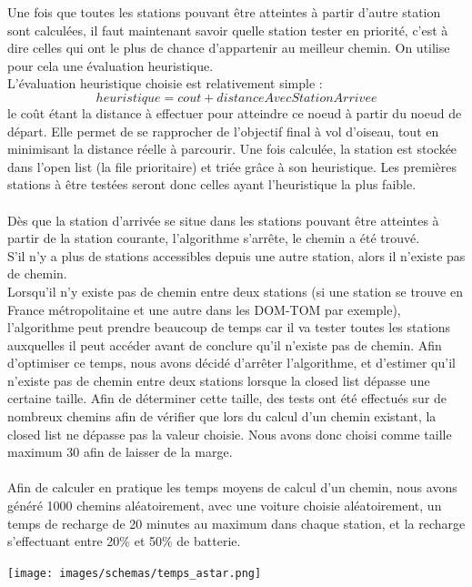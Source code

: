 \documentclass[12pt,titlepage]{report}
\begin{document}
Une fois que toutes les stations pouvant être atteintes à partir d'autre station sont calculées, il faut maintenant savoir quelle station tester en priorité, c'est à dire celles qui ont le plus de chance d'appartenir au meilleur chemin. On utilise pour cela une évaluation heuristique.\\
L'évaluation heuristique choisie est relativement simple : 
\[heuristique = cout + distance Avec Station Arrivee\]
le coût étant la distance à effectuer pour atteindre ce noeud à partir du noeud de départ.
Elle permet de se rapprocher de l'objectif final à vol d'oiseau, tout en minimisant la distance réelle à parcourir.
Une fois calculée, la station est stockée dans l'open list (la file prioritaire) et triée grâce à son heuristique. Les premières stations à être testées seront donc celles ayant l'heuristique la plus faible.
\\\\
Dès que la station d'arrivée se situe dans les stations pouvant être atteintes à partir de la station courante, l'algorithme s'arrête, le chemin a été trouvé.\\
S'il n'y a plus de stations accessibles depuis une autre station, alors il n'existe pas de chemin.\\
Lorsqu'il n'y existe pas de chemin entre deux stations (si une station se trouve en France métropolitaine et une autre dans les DOM-TOM par exemple), l'algorithme peut prendre beaucoup de temps car il va tester toutes les stations auxquelles il peut accéder avant de conclure qu'il n'existe pas de chemin.
Afin d'optimiser ce temps, nous avons décidé d'arrêter l'algorithme, et d'estimer qu'il n'existe pas de chemin entre deux stations lorsque la closed list dépasse une certaine taille. Afin de déterminer cette taille, des tests ont été effectués sur de nombreux chemins afin de vérifier que lors du calcul d'un chemin existant, la closed list ne dépasse pas la valeur choisie. Nous avons donc choisi comme taille maximum 30 afin de laisser de la marge.
\\ \\

Afin de calculer en pratique les temps moyens de calcul d'un chemin, nous avons généré 1000 chemins aléatoirement, avec une voiture choisie aléatoirement, un temps de recharge de 20 minutes au maximum dans chaque station, et la recharge s'effectuant entre 20\% et 50\% de batterie.
\begin{center}\texttt{[image: images/schemas/temps\_astar.png]}\end{center}
\end{document}
